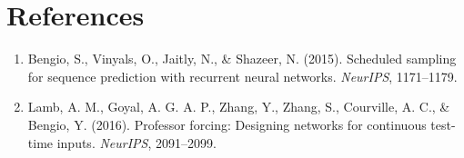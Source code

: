 \documentclass[11pt,a4paper]{article}
\theoremstyle{definition}
\begin{document}
\section{References}
\begin{enumerate}
    \item Bengio, S., Vinyals, O., Jaitly, N., \& Shazeer, N. (2015). Scheduled sampling for sequence prediction with recurrent neural networks. \emph{NeurIPS}, 1171--1179.
    \item Lamb, A. M., Goyal, A. G. A. P., Zhang, Y., Zhang, S., Courville, A. C., \& Bengio, Y. (2016). Professor forcing: Designing networks for continuous test-time inputs. \emph{NeurIPS}, 2091--2099.
\end{enumerate}
\end{document}
